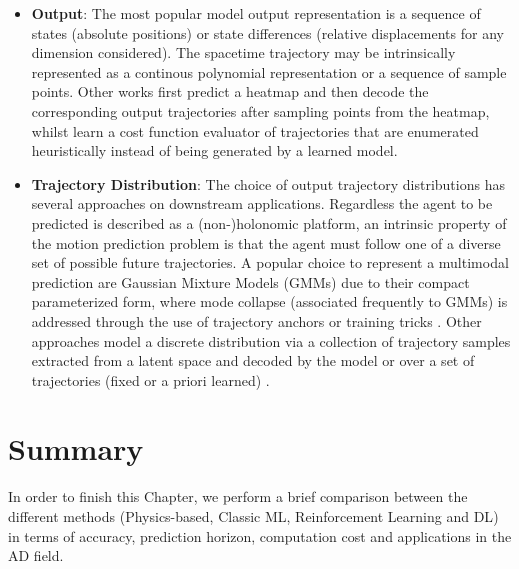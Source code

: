 \begin{itemize}
	\item \textbf{Output}: The most popular model output representation is a sequence of states (absolute positions) or state differences (relative displacements for any dimension considered). The spacetime trajectory may be intrinsically represented as a continous polynomial representation or a sequence of sample points. Other works \cite{gilles2021home} \cite{gilles2022gohome} first predict a heatmap and then decode the corresponding output trajectories after sampling points from the heatmap, whilst \cite{casas2021mp3} \cite{zeng2019end} learn a cost function evaluator of trajectories that are enumerated heuristically instead of being generated by a learned model. 
	
	\item \textbf{Trajectory Distribution}: The choice of output trajectory distributions has several approaches on downstream applications. Regardless the agent to be predicted is described as a (non-)holonomic \cite{triggs1993motion} platform, an intrinsic property of the motion prediction problem is that the agent must follow one of a diverse set of possible future trajectories. A popular choice to represent a multimodal prediction are Gaussian Mixture Models (GMMs) due to their compact parameterized form, where mode collapse (associated frequently to GMMs) is addressed through the use of trajectory anchors \cite{chai2019multipath} or training  tricks \cite{cui2019multimodal}. Other approaches model a discrete distribution via a collection of trajectory samples extracted from a latent space and decoded by the model \cite{rhinehart2018r2p2} or over a set of trajectories (fixed or a priori learned) \cite{liang2020learning}.
\end{itemize}

\section{Summary}

In order to finish this Chapter, we perform a brief comparison between the different methods (Physics-based, Classic ML, Reinforcement Learning and \ac{DL}) in terms of accuracy, prediction horizon, computation cost and applications in the \ac{AD} field. 

